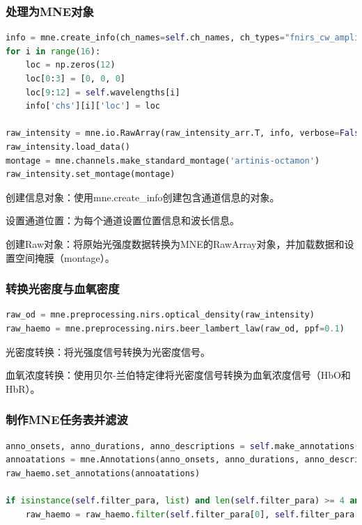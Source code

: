 \documentclass[a4paper,12pt]{article}
\begin{document}
\subsubsection{处理为MNE对象}
\begin{lstlisting}[language=python]
info = mne.create_info(ch_names=self.ch_names, ch_types="fnirs_cw_amplitude", sfreq=self.fs, verbose=None)
for i in range(16):
    loc = np.zeros(12)
    loc[0:3] = [0, 0, 0]
    loc[9:12] = self.wavelengths[i]
    info['chs'][i]['loc'] = loc

raw_intensity = mne.io.RawArray(raw_intensity_arr.T, info, verbose=False)
raw_intensity.load_data()
montage = mne.channels.make_standard_montage('artinis-octamon')
raw_intensity.set_montage(montage)

\end{lstlisting}
创建信息对象：使用mne.create\_info创建包含通道信息的对象。

设置通道位置：为每个通道设置位置信息和波长信息。

创建Raw对象：将原始光强度数据转换为MNE的RawArray对象，并加载数据和设置空间掩膜（montage）。

\subsubsection{转换光密度与血氧密度}
\begin{lstlisting}[language=python]
raw_od = mne.preprocessing.nirs.optical_density(raw_intensity)
raw_haemo = mne.preprocessing.nirs.beer_lambert_law(raw_od, ppf=0.1)
\end{lstlisting}
光密度转换：将光强度信号转换为光密度信号。

血氧浓度转换：使用贝尔-兰伯特定律将光密度信号转换为血氧浓度信号（HbO和HbR）。

\subsubsection{制作MNE任务表并滤波}
\begin{lstlisting}[language=python]
anno_onsets, anno_durations, anno_descriptions = self.make_annotations(tag_table, data_length=len(raw_haemo))
annoatations = mne.Annotations(anno_onsets, anno_durations, anno_descriptions)
raw_haemo.set_annotations(annoatations)

if isinstance(self.filter_para, list) and len(self.filter_para) >= 4 and isinstance(self.filter_para[0], (int, float)) and isinstance(self.filter_para[1], (int, float)):
    raw_haemo = raw_haemo.filter(self.filter_para[0], self.filter_para[1], h_trans_bandwidth=self.filter_para[2], l_trans_bandwidth=self.filter_para[3])

\end{lstlisting}
\end{document}
